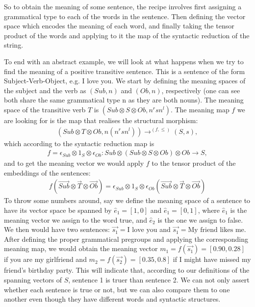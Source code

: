 So to obtain the meaning of some sentence, the recipe involves first assigning a grammatical type to each of the words in the sentence. Then defining the vector space which encodes the meaning of each word, and finally taking the tensor product of the words and applying to it the map of the syntactic reduction of the string.

To end with an abstract example, we will look at what happens when we try to find the meaning of a positive transitive sentence. This is a sentence of the form Subject-Verb-Object, e.g. I love you. We start by defining the meaning spaces of the subject and the verb as $(Sub,n)$ and $(Ob,n)$, respectively (one can see both share the same grammatical type n as they are both nouns). The meaning space of the transitive verb $T$ is $(Sub\otimes S    \otimes Ob,n^rsn^l)$. The meaning map $f$ we are looking for is the map that realises the structural morphism:
\begin{align}
    (Sub\otimes T \otimes Ob,n(n^rsn^l))\rightarrow^{(f,\leq)}(S,s),
\end{align}
which according to the syntactic reduction map is
\begin{align}
    f=\epsilon_{Sub}\otimes 1_S \otimes \epsilon_{Ob}:Sub\otimes(Sub\otimes S    \otimes Ob)\otimes Ob \rightarrow S,    
\end{align}
and to get the meaning vector we would apply $f$ to the tensor product of the embeddings of the sentences:
\begin{align}
    f(\overrightarrow{Sub}\otimes \Vec{T} \otimes \overrightarrow{Ob})=\epsilon_{Sub}\otimes 1_S \otimes \epsilon_{Ob}(\overrightarrow{Sub}\otimes \Vec{T} \otimes \overrightarrow{Ob})
\end{align}
To throw some numbers around, say we define the meaning space of a sentence to have its vector space be spanned by $\hat{e}_1=[1,0]$ and $\hat{e}_1=[0,1]$, where $\hat{e}_1$ is the meaning vector we assign to the word true, and $\hat{e}_2$ is the one we assign to false. We then would have two sentences: $\Vec{s_1}=\text{I love you}$ and $\Vec{s_1}=\text{My friend likes me}$. After defining the proper grammatical pregroups and applying the corresponding meaning map, we would obtain the meaning vector $m_1=f(\overrightarrow{s_1})=[0.90,0.28]$ if you are my girlfriend and $m_2=f(\overrightarrow{s_2})=[0.35,0.8]$ if I might have missed my friend's birthday party. This will indicate that, according to our definitions of the spanning vectors of $S$, sentence 1 is truer than sentence 2. We can not only assert whether each sentence is true or not, but we can also compare them to one another even though they have different words and syntactic structures.

